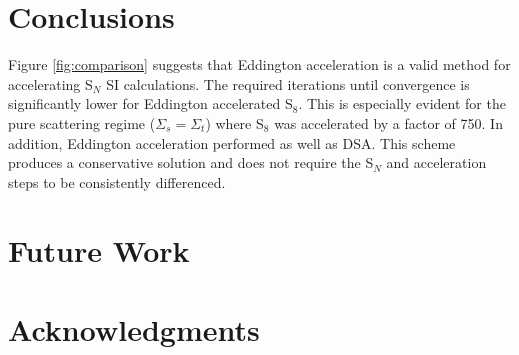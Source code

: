 \documentclass{anstrans}
\newcommand{\SN}{S$_N$\xspace}
\begin{document}
\section{Conclusions}
	Figure \ref{fig:comparison} suggests that Eddington acceleration is a valid method for accelerating \SN SI calculations. The required iterations until convergence is significantly lower for Eddington accelerated S$_8$. This is especially evident for the pure scattering regime ($\Sigma_s = \Sigma_t$) where S$_8$ was accelerated by a factor of 750. In addition, Eddington acceleration performed as well as DSA. This scheme produces a conservative solution and does not require the \SN and acceleration steps to be consistently differenced. 

\section{Future Work} 


\section{Acknowledgments}



\end{document}
